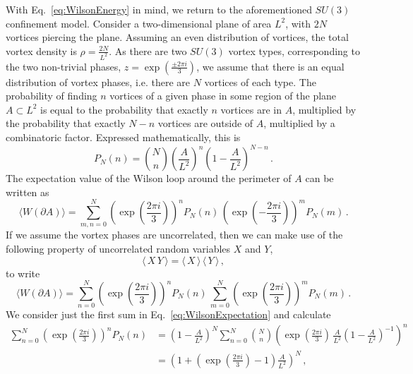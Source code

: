 With Eq.~\ref{eq:WilsonEnergy} in mind, we return to the aforementioned $SU(3)$ confinement model. Consider a two-dimensional plane of area $L^2$, with $2N$ vortices piercing the plane. Assuming an even distribution of vortices, the total vortex density is $\rho = \frac{2N}{L^2}$. As there are two $SU(3)$ vortex types, corresponding to the two non-trivial phases, $z=\exp\left(\frac{\pm 2\pi i}{3}\right)$, we assume that there is an equal distribution of vortex phases, i.e. there are $N$ vortices of each type. The probability of finding $n$ vortices of a given phase in some region of the plane $A\subset L^2$ is equal to the probability that exactly $n$ vortices are in $A$, multiplied by the probability that exactly $N-n$ vortices are outside of $A$, multiplied by a combinatoric factor. Expressed mathematically, this is
%
\begin{equation}
P_N(n) = \binom{N}{n} \left(\frac{A}{L^2}\right)^n \left(1-\frac{A}{L^2}\right)^{N-n}\, .
\end{equation}
%
The expectation value of the Wilson loop around the perimeter of $A$ can be written as
%
\begin{equation}
\langle W(\partial A)\rangle = \sum_{m,n = 0}^N \left(\exp\left(\frac{2\pi i}{3}\right)\right)^n P_N(n)\, \left(\exp\left(-\frac{2\pi i}{3}\right)\right)^m P_N(m)\, .
\end{equation}
%
If we assume the vortex phases are uncorrelated, then we can make use of the following property of uncorrelated random variables $X$ and $Y$,
%
\begin{equation}
\langle\,X\,Y\,\rangle = \langle\,X\,\rangle\,\langle\,Y\,\rangle\, ,
\end{equation}
%
to write
%
\begin{equation}
\langle W(\partial A)\rangle = \sum_{n=0}^N \left(\exp\left(\frac{2\pi i}{3}\right)\right)^n P_N(n)\,\sum_{m=0}^N \left(\exp\left(\frac{2\pi i}{3}\right)\right)^m P_N(m)\, .
\label{eq:WilsonExpectation}
\end{equation}
%
We consider just the first sum in Eq.~\ref{eq:WilsonExpectation} and calculate
%
\begin{align*}
\sum_{n=0}^N \left(\exp\left(\frac{2\pi i}{3}\right)\right)^n P_N(n) & = \left(1-\frac{A}{L^2}\right)^{N}\sum_{n=0}^{N} \binom{N}{n} \left(\exp\left(\frac{2\pi i}{3}\right)\,\frac{A}{L^2}\left(1-\frac{A}{L^2}\right)^{-1}\right)^n\\
&=\left(1+\left(\exp\left(\frac{2\pi i}{3}\right) - 1\right)\frac{A}{L^2}\right)^N\, ,
\end{align*}
